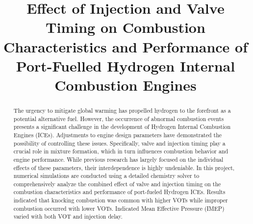 \documentclass[conference]{IEEEtran}
\begin{document}
\title{Effect of Injection and Valve Timing on Combustion Characteristics and Performance of Port-Fuelled Hydrogen Internal Combustion Engines
}

\author{
\and
{}
\and
{}
\and
{}
\and
{}
}

\maketitle

\begin{abstract}
    The urgency to mitigate global warming has propelled hydrogen to the forefront as a potential alternative fuel. However, the occurrence of abnormal combustion events presents a significant challenge in the development of Hydrogen Internal Combustion Engines (ICEs). Adjustments to engine design parameters have demonstrated the possibility of controlling these issues. Specifically, valve and injection timing play a crucial role in mixture formation, which in turn influences combustion behavior and engine performance. While previous research has largely focused on the individual effects of these parameters, their interdependence is highly undeniable. In this project, numerical simulations are conducted using a detailed chemistry solver to comprehensively analyze the combined effect of valve and injection timing on the combustion characteristics and performance of port-fueled Hydrogen ICEs. Results indicated that knocking combustion was common with higher VOTs while improper combustion occurred with lower VOTs. Indicated Mean Effective Pressure (IMEP) varied with both VOT and injection delay.

\end{abstract}
\end{document}
